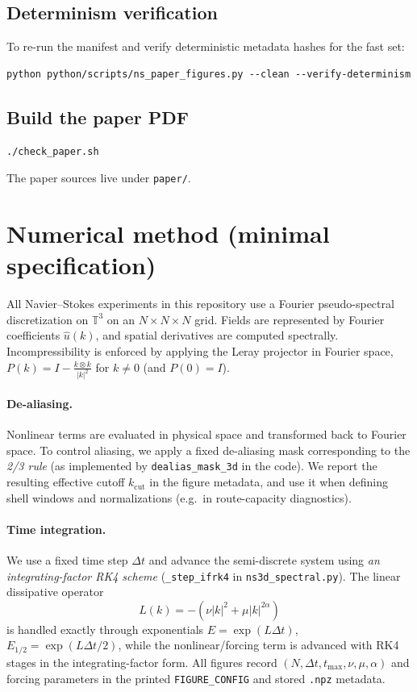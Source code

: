 \documentclass[11pt]{article}
\newcommand{\T}{\mathbb{T}}
\begin{document}
\subsection{Determinism verification}
To re-run the manifest and verify deterministic metadata hashes for the fast set:
\begin{verbatim}
python python/scripts/ns_paper_figures.py --clean --verify-determinism
\end{verbatim}

\subsection{Build the paper PDF}
\begin{verbatim}
./check_paper.sh
\end{verbatim}
The paper sources live under \texttt{paper/}.
 \section{Numerical method (minimal specification)}\label{app:numerics}

All Navier--Stokes experiments in this repository use a Fourier pseudo-spectral discretization \citep{canuto1988spectral} on
\(\T^3\) on an \(N\times N\times N\) grid. Fields are represented by Fourier coefficients \(\hat u(k)\),
and spatial derivatives are computed spectrally. Incompressibility is enforced by applying the
Leray projector in Fourier space, \(P(k)=I-\frac{k\otimes k}{|k|^2}\) for \(k\neq 0\) (and \(P(0)=I\)).

\paragraph{De-aliasing.}
Nonlinear terms are evaluated in physical space and transformed back to Fourier space.
To control aliasing, we apply a fixed de-aliasing mask corresponding to the \emph{2/3 rule} \citep{orszag1971aliasing}
(as implemented by \texttt{dealias\_mask\_3d} in the code). We report the resulting effective cutoff
\(k_{\mathrm{cut}}\) in the figure metadata, and use it when defining shell windows and
normalizations (e.g.\ in route-capacity diagnostics).

\paragraph{Time integration.}
We use a fixed time step \(\Delta t\) and advance the semi-discrete system using
\emph{an integrating-factor RK4 scheme} (\texttt{\_step\_ifrk4} in \texttt{ns3d\_spectral.py}).
The linear dissipative operator
\[
L(k)=-(\nu |k|^2 + \mu |k|^{2\alpha})
\]
is handled exactly through exponentials \(E=\exp(L\Delta t)\), \(E_{1/2}=\exp(L\Delta t/2)\),
while the nonlinear/forcing term is advanced with RK4 stages in the integrating-factor form.
All figures record \((N,\Delta t,t_{\max},\nu,\mu,\alpha)\) and forcing parameters in the printed
\texttt{FIGURE\_CONFIG} and stored \texttt{.npz} metadata.
\end{document}
